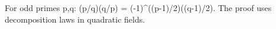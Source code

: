 For odd primes p,q: (p/q)(q/p) = (-1)^{((p-1)/2)((q-1)/2)}. The proof uses decomposition laws in quadratic fields.

